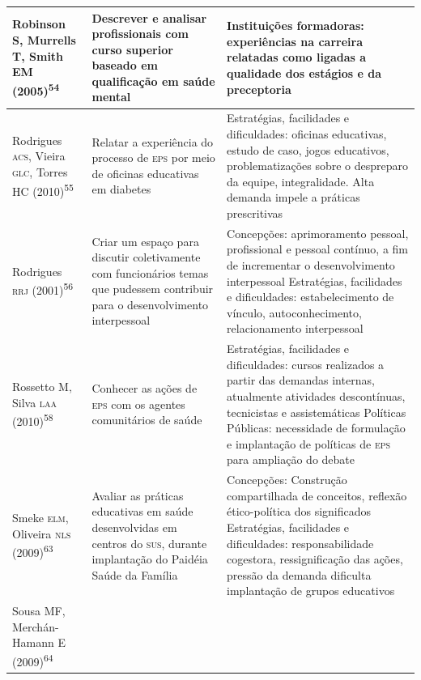 \documentclass{article}
\begin{document}
\begin{table}
\begin{xtabular}{ l | l | l }
Robinson S, Murrells T, Smith EM (2005)\textsuperscript{54}

& Descrever e analisar profissionais com curso superior baseado em qualificação
em saúde mental
& Instituições formadoras: experiências na carreira relatadas como ligadas a
qualidade dos estágios e da preceptoria
\\ \hline

Rodrigues \textsc{acs}, Vieira \textsc{glc}, Torres HC (2010)\textsuperscript{55}

& Relatar a experiência do processo de \textsc{eps} por meio de oficinas educativas em
diabetes
& Estratégias, facilidades e dificuldades: oficinas educativas, estudo de caso,
jogos educativos, problematizações sobre o despreparo da equipe, integralidade.
Alta demanda impele a práticas prescritivas
\\ \hline

Rodrigues \textsc{rrj} (2001)\textsuperscript{56}

& Criar um espaço para discutir coletivamente com funcionários temas que
pudessem contribuir para o desenvolvimento interpessoal
& Concepções: aprimoramento pessoal, profissional e pessoal contínuo, a fim de
incrementar o desenvolvimento interpessoal Estratégias, facilidades e
dificuldades: estabelecimento de vínculo, autoconhecimento, relacionamento
interpessoal
\\ \hline

Rossetto M, Silva \textsc{laa} (2010)\textsuperscript{58}

& Conhecer as ações de \textsc{eps} com os agentes comunitários de saúde
& Estratégias, facilidades e dificuldades: cursos realizados a partir das
demandas internas, atualmente atividades descontínuas, tecnicistas e
assistemáticas Políticas Públicas: necessidade de formulação e implantação de
políticas de \textsc{eps} para ampliação do debate
\\ \hline

Smeke \textsc{elm}, Oliveira \textsc{nls} (2009)\textsuperscript{63}

& Avaliar as práticas educativas em saúde desenvolvidas em centros do \textsc{sus},
durante implantação do Paidéia Saúde da Família
& Concepções: Construção compartilhada de conceitos, reflexão ético-política dos
significados Estratégias, facilidades e dificuldades: responsabilidade
cogestora, ressignificação das ações, pressão da demanda dificulta implantação
de grupos educativos
\\ \hline

Sousa MF, Merchán-Hamann E (2009)\textsuperscript{64}


\end{xtabular}
\end{table}
\end{document}
